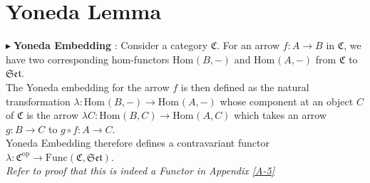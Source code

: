 \documentclass{article}
\theoremstyle{definition}
\theoremstyle{remark}
\theoremstyle{definition}
\theoremstyle{definition}
\theoremstyle{definition}
\newcommand{\cat}[1]{\mathfrak{#1}}
\newcommand{\opcat}[1]{\mathfrak{#1}^{\text{op}}}
\newcommand{\homset}[3]{\text{Hom}_{#1}(#2,#3)}
\newcommand{\point}[0]{$\blacktriangleright\;$}
\newcommand{\Func}[2]{\text{Func}\left (#1,#2\right )}
\begin{document}
\section{Yoneda Lemma}
\point \textbf{Yoneda Embedding} : Consider a category $ \cat{C} $. For an arrow $ f : A\to B $ in $ \cat{C} $, we have two corresponding hom-functors $ \homset{}{B}{-} $ and $ \homset{}{A}{-} $ from $ \cat{C}  $ to $ \cat{Set} $.\\
 The Yoneda embedding for the arrow $ f $ is then defined as the natural transformation $ \lambda : \homset{}{B}{-} \longrightarrow \homset{}{A}{-}$ whose component at an object $ C $ of $ \cat{C} $ is the arrow $ \lambda C : \homset{}{B}{C} \to \homset{}{A}{C} $ which takes an arrow $ g : B\to C $ to $ g\circ f : A\to C$. \\
 Yoneda Embedding therefore defines a contravariant functor $ \lambda : \opcat{C} \to \Func{\cat{C}}{\cat{Set}}$.\\
 \emph{Refer to proof that this is indeed a Functor in Appendix \ref{A-5}}\\
\end{document}
